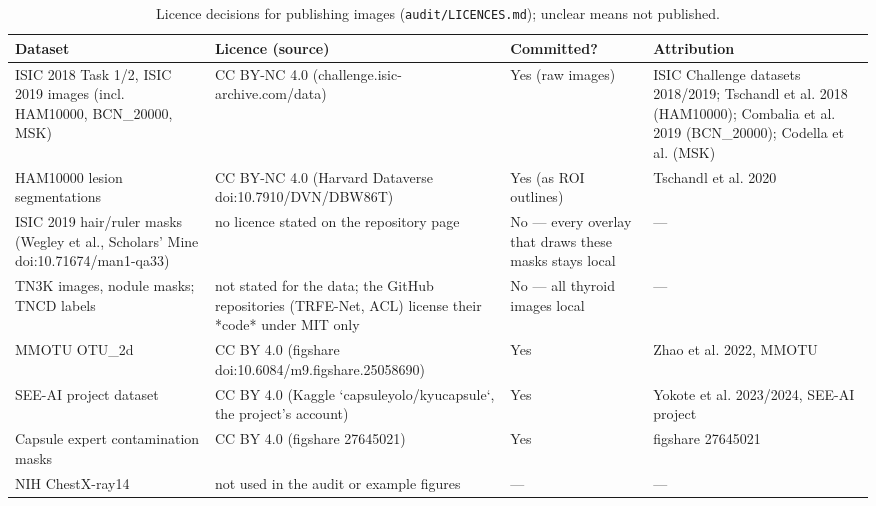 \begin{table}[H]\centering\scriptsize
\caption{Licence decisions for publishing images (\texttt{audit/LICENCES.md}); unclear means not published.}\label{tab:lic}
\begin{tabular}{p{3.6cm}p{4.0cm}p{2.8cm}p{4.2cm}}\toprule
Dataset & Licence (source) & Committed? & Attribution \\\midrule
ISIC 2018 Task 1/\allowbreak{}2, ISIC 2019 images (incl. HAM10000, BCN\_20000, MSK) & CC BY-NC 4.0 (challenge.isic-archive.com/\allowbreak{}data) & Yes (raw images) & ISIC Challenge datasets 2018/\allowbreak{}2019; Tschandl et al. 2018 (HAM10000); Combalia et al. 2019 (BCN\_20000); Codella et al. (MSK) \\
HAM10000 lesion segmentations & CC BY-NC 4.0 (Harvard Dataverse doi:10.7910/\allowbreak{}DVN/\allowbreak{}DBW86T) & Yes (as ROI outlines) & Tschandl et al. 2020 \\
ISIC 2019 hair/\allowbreak{}ruler masks (Wegley et al., Scholars' Mine doi:10.71674/\allowbreak{}man1-qa33) & no licence stated on the repository page & No — every overlay that draws these masks stays local & — \\
TN3K images, nodule masks; TNCD labels & not stated for the data; the GitHub repositories (TRFE-Net, ACL) license their *code* under MIT only & No — all thyroid images local & — \\
MMOTU OTU\_2d & CC BY 4.0 (figshare doi:10.6084/\allowbreak{}m9.figshare.25058690) & Yes & Zhao et al. 2022, MMOTU \\
SEE-AI project dataset & CC BY 4.0 (Kaggle `capsuleyolo/\allowbreak{}kyucapsule`, the project's account) & Yes & Yokote et al. 2023/\allowbreak{}2024, SEE-AI project \\
Capsule expert contamination masks & CC BY 4.0 (figshare 27645021) & Yes & figshare 27645021 \\
NIH ChestX-ray14 & not used in the audit or example figures & — & — \\
\bottomrule\end{tabular}
\end{table}
